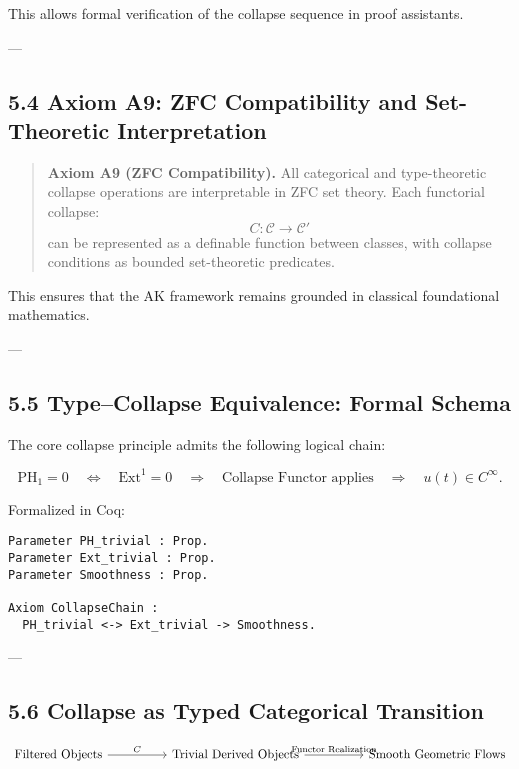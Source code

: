 \documentclass[11pt]{article}
\begin{document}
This allows formal verification of the collapse sequence in proof assistants.

---

\subsection*{5.4 Axiom A9: ZFC Compatibility and Set-Theoretic Interpretation}

\begin{quote}
\textbf{Axiom A9 (ZFC Compatibility).}  
All categorical and type-theoretic collapse operations are interpretable in ZFC set theory.  
Each functorial collapse:
\[
C: \mathcal{C} \to \mathcal{C}'
\]
can be represented as a definable function between classes,  
with collapse conditions as bounded set-theoretic predicates.
\end{quote}

This ensures that the AK framework remains grounded in classical foundational mathematics.

---

\subsection*{5.5 Type–Collapse Equivalence: Formal Schema}

The core collapse principle admits the following logical chain:

\[
\mathrm{PH}_1 = 0 \quad \Longleftrightarrow \quad 
\mathrm{Ext}^1 = 0 \quad \Longrightarrow \quad 
\text{Collapse Functor applies} \quad \Rightarrow \quad 
u(t) \in C^\infty.
\]

Formalized in Coq:

\begin{lstlisting}[language=Coq, caption=Collapse Typing Schema in Coq]
Parameter PH_trivial : Prop.
Parameter Ext_trivial : Prop.
Parameter Smoothness : Prop.

Axiom CollapseChain :
  PH_trivial <-> Ext_trivial -> Smoothness.
\end{lstlisting}

---

\subsection*{5.6 Collapse as Typed Categorical Transition}

\[
\begin{tikzcd}[column sep=huge, row sep=large]
\text{Filtered Objects} \arrow[r, "C"]
& \text{Trivial Derived Objects} \arrow[r, "\text{Functor Realization}"]
& \text{Smooth Geometric Flows}
\end{tikzcd}
\]
\end{document}
